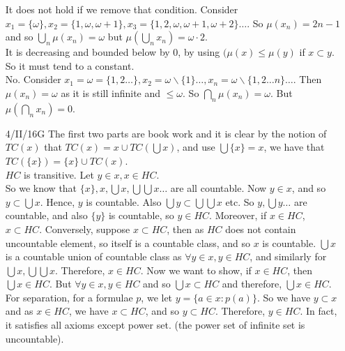 \begin{enumerate}
      It does not hold if we remove that condition. Consider $x_1=\{\omega\}, x_2=\{1,\omega,\omega+1\}, x_3=\{1,2,\omega,\omega+1,\omega+2\} \ldots$. So $\mu(x_n)=2n-1$ and so $\bigcup_n \mu(x_n)=\omega$ but $\mu(\bigcup_n x_n)=\omega \cdot 2$.\\
      It is decreasing and bounded below by $0$, by using $(\mu(x) \le \mu(y)$ if $x \subset y$. So it must tend to a constant.\\
      No. Consider $x_1=\omega=\{1,2 \ldots\}, x_2 =\omega \backslash \{1\} \ldots, x_n=\omega \backslash \{1,2 \ldots n\} \ldots$. Then $\mu(x_n)=\omega$ as it is still infinite and $\le \omega$. So $\bigcap_n \mu(x_n)=\omega$. But $\mu(\bigcap_n x_n)=0$.\\
\item[4/II/16G] The first two parts are book work and it is clear by the notion of $TC(x)$ that $TC(x)= x \cup TC(\bigcup x)$, and use $\bigcup \{x\}=x$, we have that $TC(\{x\})=\{x\} \cup TC(x)$. \\
    $HC$ is transitive. Let $y \in x, x \in HC$.\\
     So we know that $\{x\},x, \bigcup x,\bigcup \bigcup x \ldots$ are all countable. Now $y \in x$, and so $y \subset \bigcup x$. Hence, $y$ is countable. Also $\bigcup y \subset \bigcup \bigcup x$ etc. So $y, \bigcup y \ldots$ are countable, and also $\{y\}$ is countable, so $y \in HC$. Moreover, if $x \in HC$, $x \subset HC$. Conversely, suppose $x \subset HC$, then as $HC$ does not contain uncountable element, so itself is a countable class, and so $x$ is countable. $\bigcup x$ is a countable union of countable class as $\forall y \in x, y \in HC$, and similarly for $\bigcup x, \bigcup \bigcup x$. Therefore, $x \in HC$. Now we want to show, if $x \in HC$, then $\bigcup x \in HC$. But $\forall y \in x, y \in HC$ and so $\bigcup x \subset HC$ and therefore, $\bigcup x \in HC$. For separation, for a formulae $p$, we let $y=\{a \in x: p(a)\}$. So we have $y \subset x$ and as $x \in HC$, we have $x \subset HC$, and so $y \subset HC$. Therefore, $y \in HC$. In fact, it satisfies all axioms except power set. (the power set of infinite set is uncountable).
\end{enumerate}
